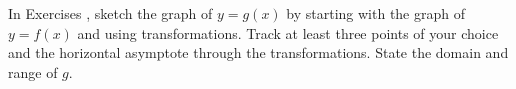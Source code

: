 {\noindent In Exercises}
{, sketch the graph of $y=g(x)$ by starting with the graph of $y = f(x)$ and using transformations.  Track at least three points of your choice and the horizontal asymptote through the transformations. State the domain and range of $g$.}
